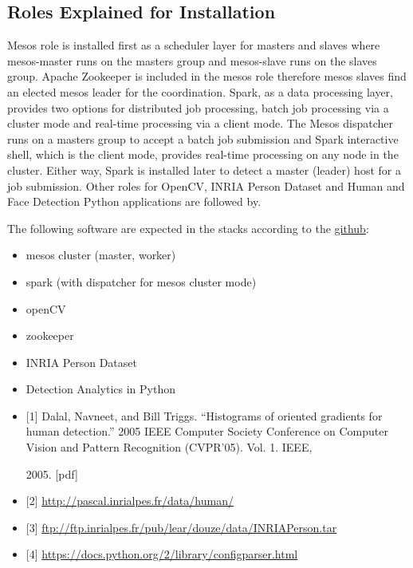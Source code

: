 \subsection{Roles Explained for
Installation}\label{roles-explained-for-installation}

Mesos role is installed first as a scheduler layer for masters and
slaves where mesos-master runs on the masters group and mesos-slave runs
on the slaves group. Apache Zookeeper is included in the mesos role
therefore mesos slaves find an elected mesos leader for the
coordination. Spark, as a data processing layer, provides two options
for distributed job processing, batch job processing via a cluster mode
and real-time processing via a client mode. The Mesos dispatcher runs on
a masters group to accept a batch job submission and Spark interactive
shell, which is the client mode, provides real-time processing on any
node in the cluster. Either way, Spark is installed later to detect a
master (leader) host for a job submission. Other roles for OpenCV, INRIA
Person Dataset and Human and Face Detection Python applications are
followed by.

The following software are expected in the stacks according to the
\href{https://github.com/futuresystems/pedestrian-and-face-detection}{github}:

\begin{itemize}
\tightlist
\item
  mesos cluster (master, worker)
\item
  spark (with dispatcher for mesos cluster mode)
\item
  openCV
\item
  zookeeper
\item
  INRIA Person Dataset
\item
  Detection Analytics in Python
\item
  {[}1{]} Dalal, Navneet, and Bill Triggs. ``Histograms of oriented
  gradients for human detection.'' 2005 IEEE Computer Society Conference
  on Computer Vision and Pattern Recognition (CVPR'05). Vol. 1. IEEE,

  2005. {[}pdf{]}
\item
  {[}2{]} \url{http://pascal.inrialpes.fr/data/human/}
\item
  {[}3{]}
  \url{ftp://ftp.inrialpes.fr/pub/lear/douze/data/INRIAPerson.tar}
\item
  {[}4{]} \url{https://docs.python.org/2/library/configparser.html}
\end{itemize}

